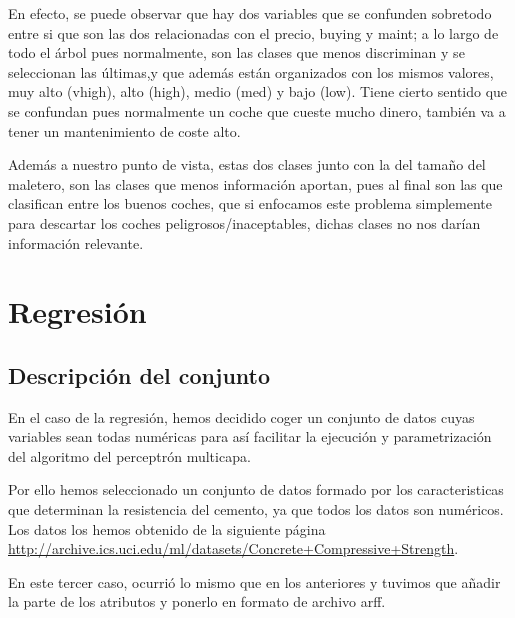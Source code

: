 \documentclass[a4paper, 11pt, twoside, openany, onecolumn, final]{memoir}
\begin{document}
	En efecto, se puede observar que hay dos variables que se confunden sobretodo entre si que son las dos relacionadas con el precio, buying y maint; a lo largo de todo el árbol pues normalmente, son las clases que menos discriminan y se seleccionan las últimas,y que además están organizados con los mismos valores, muy alto (vhigh), alto (high), medio (med) y bajo (low). Tiene cierto sentido que se confundan pues normalmente un coche que cueste mucho dinero, también va a tener un mantenimiento de coste alto. 
	
	Además a nuestro punto de vista, estas dos clases junto con la del tamaño del maletero, son las clases que menos información aportan, pues al final son las que clasifican entre los buenos coches, que si enfocamos este problema simplemente para descartar los coches peligrosos/inaceptables, dichas clases no nos darían información relevante.
	
\chapter{Regresión}
	\section{Descripción del conjunto}
	En el caso de la regresión, hemos decidido coger un conjunto de datos cuyas variables sean todas numéricas para así facilitar la ejecución y parametrización del algoritmo del perceptrón multicapa. 
	
	Por ello hemos seleccionado un conjunto de datos formado por los caracteristicas que determinan la resistencia del cemento, ya que todos los datos son numéricos.
	Los datos los hemos obtenido de la siguiente página \url{http://archive.ics.uci.edu/ml/datasets/Concrete+Compressive+Strength}.
	
	En este tercer caso, ocurrió lo mismo que en los anteriores y tuvimos que añadir la parte de los atributos y ponerlo en formato de archivo arff.
	
\end{document}

